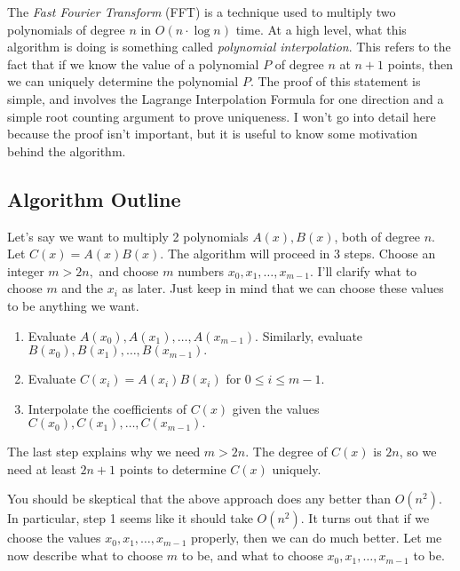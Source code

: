 The \emph{Fast Fourier Transform} (FFT) is a technique used to multiply two polynomials of degree $n$ in $O(n \cdot \log n)$ time. At a high level, what this algorithm is doing is something called \emph{polynomial interpolation}. This refers to the fact that if we know the value of a polynomial $P$ of degree $n$ at $n+1$ points, then we can uniquely determine the polynomial $P.$ The proof of this statement is simple, and involves the Lagrange Interpolation Formula for one direction and a simple root counting argument to prove uniqueness. I won't go into detail here because the proof isn't important, but it is useful to know some motivation behind the algorithm.

\subsection{Algorithm Outline}

Let's say we want to multiply 2 polynomials $A(x), B(x)$, both of degree $n$. Let $C(x) = A(x)B(x).$ The algorithm will proceed in 3 steps. Choose an integer $m > 2n,$ and choose $m$ numbers $x_0, x_1, \dots, x_{m-1}.$ I'll clarify what to choose $m$ and the $x_i$ as later. Just keep in mind that we can choose these values to be anything we want.

\begin{enumerate}

\item Evaluate $A(x_0), A(x_1), \dots, A(x_{m-1}).$ Similarly, evaluate $B(x_0), B(x_1), \dots, B(x_{m-1}).$

\item Evaluate $C(x_i) = A(x_i)B(x_i)$ for $0 \le i \le m-1.$

\item Interpolate the coefficients of $C(x)$ given the values $C(x_0), C(x_1), \dots, C(x_{m-1}).$

\end{enumerate}

The last step explains why we need $m > 2n.$ The degree of $C(x)$ is $2n$, so we need at least $2n+1$ points to determine $C(x)$ uniquely.

You should be skeptical that the above approach does any better than $O(n^2).$ In particular, step 1 seems like it should take $O(n^2).$ It turns out that if we choose the values $x_0, x_1, \dots, x_{m-1}$ properly, then we can do much better. Let me now describe what to choose $m$ to be, and what to choose $x_0, x_1, \dots, x_{m-1}$ to be.


